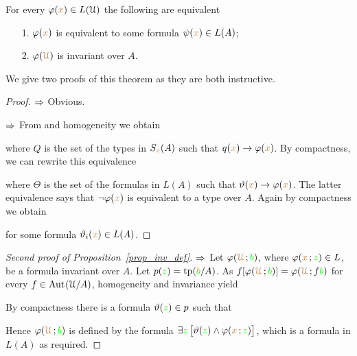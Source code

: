 \documentclass[creche.tex]{subfiles}
\begin{document}
\begin{proposition}\label{prop_inv_def}
For every $\varphi({\color{brown} x})\in L(\EuScript U)$ the following are equivalent
\begin{itemize}
 \item[1.] $\varphi({\color{brown} x})$ is equivalent to some formula $\psi({\color{brown} x})\in L(A)$;
 \item[2.] $\varphi({\color{brown}\EuScript U})$ is invariant over $A$.
\end{itemize}
\end{proposition}

We give two proofs of this theorem as they are both instructive. 

\begin{proof}
$\Rightarrow$ Obvious.

$\Rightarrow$ From  and homogeneity we obtain


where $Q$ is the set of the types in $S_{\color{brown} x}(A)$ such that $q({\color{brown} x})\rightarrow\varphi({\color{brown} x})$. 
By compactness, we can rewrite this equivalence 


where $\Theta$ is the set of the formulas in $L(A)$ such that $\vartheta({\color{brown} x})\rightarrow\varphi({\color{brown} x})$.
The latter equivalence says that $\neg\varphi({\color{brown} x})$ is equivalent to a type over $A$. 
Again by compactness we obtain 


for some formula $\vartheta_i({\color{brown} x})\in L(A)$.
\end{proof}


\begin{proof}[Second proof of Proposition~\ref{prop_inv_def}] $\Rightarrow$ Let $\varphi({\color{brown}\EuScript U}\,;{\color{green} b})$, where $\varphi({\color{brown} x}\,;{\color{green} z})\in L$, be a formula invariant over $A$. Let $p({\color{green} z})={\rm tp}({\color{green} b}/A)$. As $f[\varphi({\color{brown}\EuScript U}\,;{\color{green} b})]=\varphi({\color{brown}\EuScript U}\,;f{\color{green} b})$  for every $f\in\textrm{Aut\kern.15ex}(\EuScript U/A)$, homogeneity and invariance yield


By compactness there is a formula $\vartheta({\color{green} z})\in p$ such that 


Hence  $\varphi({\color{brown}\EuScript U}\,;{\color{green} b})$ is defined by the formula $\exists {\color{green}z}\,\big[\vartheta({\color{green} z})\wedge\varphi({\color{brown} x}\,;{\color{green} z})\big]$, which is a formula in $L(A)$ as required.
\end{proof}
\end{document}
